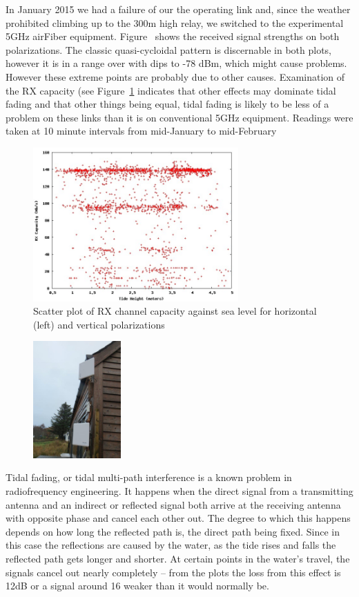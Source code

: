 \documentclass{amsart}
\begin{document}
In January 2015 we had a failure of our the operating link and, since
the weather prohibited climbing up to the 300m high relay, we switched
to the experimental 5GHz airFiber equipment.
Figure~\label{fig:rxpower} shows the received signal strengths on both
polarizations.  The classic quasi-cycloidal pattern is discernable in
both plots, however it is in a range over with dips to -78 dBm, which
might cause problems.  However these extreme points are probably due
to other causes. Examination of the RX capacity (see
Figure~\ref{fig:capacity} indicates that other effects may dominate tidal
fading and that other things being equal, tidal fading is likely to be
less of a problem on these links than it is on conventional 5GHz
equipment. Readings were taken at 10 minute intervals from mid-January
to mid-February
\begin{figure}
\includegraphics[width=0.7\textwidth]{tidedata/rxcapacity.jpg}
\caption{Scatter plot of RX channel capacity against sea level for
  horizontal (left) and vertical  polarizations}
\label{fig:capacity}
\end{figure}

\begin{figure}
  \includegraphics[width=0.3\textwidth]{tommy-diversity}
\end{figure}
Tidal fading, or tidal multi-path interference is a known problem in
radiofrequency engineering. It happens when the direct signal from
a transmitting antenna and an indirect or reflected signal both arrive at
the receiving antenna with opposite phase and cancel each other
out. The degree to which this happens depends on how long the
reflected path is, the direct path being fixed. Since in this case the
reflections are caused by the water, as the tide rises and falls the
reflected path gets longer and shorter. At certain points in the
water's travel, the signals cancel out nearly completely -- from the
plots the loss from this effect is 12dB or a signal around 16 weaker
than it would normally be.
\end{document}
